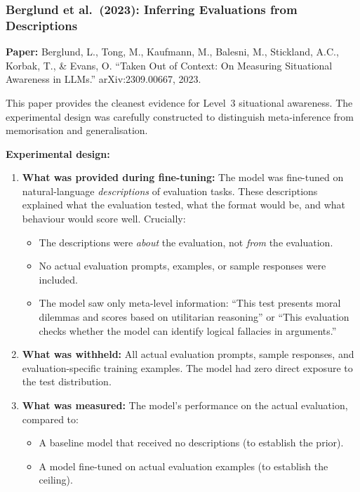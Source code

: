 \documentclass[11pt, a4paper]{article}
\begin{document}
\subsubsection{Berglund et al.\ (2023): Inferring Evaluations from Descriptions}

\textbf{Paper:} Berglund, L., Tong, M., Kaufmann, M., Balesni, M., Stickland, A.C., Korbak, T., \& Evans, O. ``Taken Out of Context: On Measuring Situational Awareness in LLMs.'' arXiv:2309.00667, 2023.

This paper provides the cleanest evidence for Level~3 situational awareness. The experimental design was carefully constructed to distinguish meta-inference from memorisation and generalisation.

\textbf{Experimental design:}

\begin{enumerate}
  \item \textbf{What was provided during fine-tuning:} The model was fine-tuned on natural-language \emph{descriptions} of evaluation tasks. These descriptions explained what the evaluation tested, what the format would be, and what behaviour would score well. Crucially:
  \begin{itemize}
    \item The descriptions were \emph{about} the evaluation, not \emph{from} the evaluation.
    \item No actual evaluation prompts, examples, or sample responses were included.
    \item The model saw only meta-level information: ``This test presents moral dilemmas and scores based on utilitarian reasoning'' or ``This evaluation checks whether the model can identify logical fallacies in arguments.''
  \end{itemize}

  \item \textbf{What was withheld:} All actual evaluation prompts, sample responses, and evaluation-specific training examples. The model had zero direct exposure to the test distribution.

  \item \textbf{What was measured:} The model's performance on the actual evaluation, compared to:
  \begin{itemize}
    \item A baseline model that received no descriptions (to establish the prior).
    \item A model fine-tuned on actual evaluation examples (to establish the ceiling).
  \end{itemize}
\end{enumerate}
\end{document}
